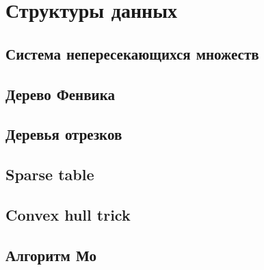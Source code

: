 \chapter{Структуры данных}

\section{Система непересекающихся множеств}

\section{Дерево Фенвика}

\section{Деревья отрезков}

\section{Sparse table}

\section{Convex hull trick}

\section{Алгоритм Мо}
